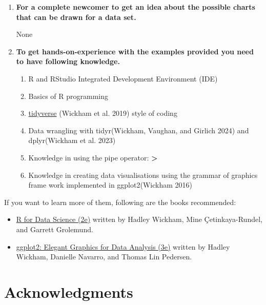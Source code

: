 \documentclass[
  letterpaper,
  DIV=11,
  numbers=noendperiod]{scrreprt}
\begin{document}

\begin{enumerate}
\def\labelenumi{\arabic{enumi}.}
\item
  \textbf{For a complete newcomer to get an idea about the possible
  charts that can be drawn for a data set.}

  None
\item
  \textbf{To get hands-on-experience with the examples provided you need
  to have following knowledge.}

  \begin{enumerate}
  \def\labelenumii{\roman{enumii}.}
  \item
    R and RStudio Integrated Development Environment (IDE)
  \item
    Basics of R programming
  \item
    \href{https://www.tidyverse.org/}{tidyverse} (Wickham et al. 2019)
    style of coding
  \item
    Data wrangling with tidyr(Wickham, Vaughan, and Girlich 2024) and
    dplyr(Wickham et al. 2023)
  \item
    Knowledge in using the pipe operator:
    \textbf{\textbar\textgreater{}}
  \item
    Knowledge in creating data visualisations using the grammar of
    graphics frame work implemented in ggplot2(Wickham 2016)
  \end{enumerate}
\end{enumerate}

If you want to learn more of them, following are the books recommended:

\begin{itemize}
\item
  \href{https://r4ds.hadley.nz/}{R for Data Science (2e)} written by
  Hadley Wickham, Mine Çetinkaya-Rundel, and Garrett Grolemund.
\item
  \href{https://ggplot2-book.org/}{ggplot2: Elegant Graphics for Data
  Analysis (3e)} written by Hadley Wickham, Danielle Navarro, and Thomas
  Lin Pedersen.
\end{itemize}

\section*{Acknowledgments}\label{acknowledgments}

\end{document}
